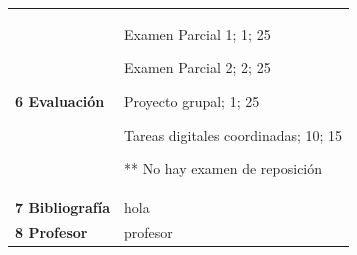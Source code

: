 \documentclass[letterpaper]{article}%
\begin{document}
\renewcommand{\arraystretch}{1.5}%
\begin{longtable}{>{\raggedright}p{}p{}}%
\par\fontsize{12}{0}\selectfont \textbf{\textcolor{parte}{6 Evaluación}}&

Examen Parcial 1; 1; 25

Examen Parcial 2; 2; 25

Proyecto grupal; 1; 25

Tareas digitales coordinadas; 10; 15



** No hay examen de reposición	 	 	 	 	 \\%
\par\fontsize{12}{0}\selectfont \textbf{\textcolor{parte}{7 Bibliografía}}&hola\\%
\par\fontsize{12}{0}\selectfont \textbf{\textcolor{parte}{8 Profesor}}&profesor\\%
\end{longtable}%
\end{document}
